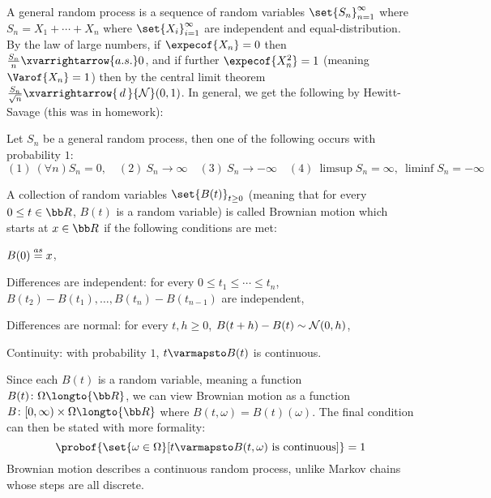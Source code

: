 A general random process is a sequence of random variables $\set{S_n}_{n=1}^\infty$ where $S_n=X_1+\cdots+X_n$ where $\set{X_i}_{i=1}^\infty$ are independent and equal-distribution.
By the law of large numbers, if $\expecof{X_n}=0$ then $\frac{S_n}n\xvarrightarrow{a.s.}0$, and if further $\expecof{X_n^2}=1$ (meaning $\Varof{X_n}=1$) then by the central limit theorem
$\frac{S_n}{\sqrt n}\xvarrightarrow{\,d\,}{\cal N}(0,1)$.
In general, we get the following by Hewitt-Savage (this was in homework):

\bthrm

    Let $S_n$ be a general random process, then one of the following occurs with probability $1$:
    $$ (1)\ (\forall n)S_n=0,\quad (2)\ S_n\to\infty\quad (3)\ S_n\to-\infty\quad (4)\ \limsup S_n=\infty,\ \liminf S_n=-\infty $$

\ethrm


\bdefn

    A collection of random variables $\set{B(t)}_{t\geq0}$ (meaning that for every $0\leq t\in{\bb R}$, $B(t)$ is a random variable) is called {\emphcolor Brownian motion} which starts at $x\in{\bb R}$ if
    the following conditions are met:
    \benum
        \item $B(0)\buildrel as\over=x$,
        \item Differences are independent: for every $0\leq t_1\leq\cdots\leq t_n$, $B(t_2)-B(t_1),\dots,B(t_n)-B(t_{n-1})$ are independent,
        \item Differences are normal: for every $t,h\geq0$, $B(t+h)-B(t)\sim{\cal N}(0,h)$,
        \item Continuity: with probability $1$, $t\varmapsto B(t)$ is continuous.
    \eenum

\edefn

Since each $B(t)$ is a random variable, meaning a function $B(t)\colon\Omega\longto{\bb R}$, we can view Brownian motion as a function $B\colon[0,\infty)\times\Omega\longto{\bb R}$ where
$B(t,\omega)=B(t)(\omega)$.
The final condition can then be stated with more formality:
$$ \probof{\set{\omega\in\Omega}[t\varmapsto B(t,\omega)\hbox{ is continuous}]} = 1 $$
Brownian motion describes a continuous random process, unlike Markov chains whose steps are all discrete.


